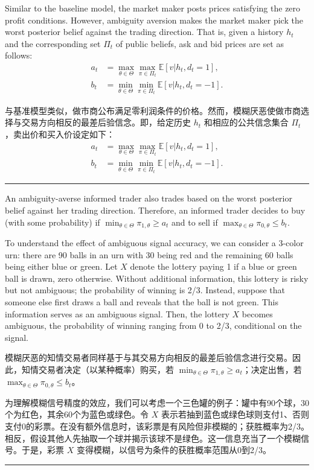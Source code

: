 \documentclass[12pt,a4paper]{article}
\newenvironment{original}{%
  \par\vspace{4pt}\noindent%
  \color{black}%
  \ignorespaces
}{%
  \par\vspace{2pt}%
}
\newenvironment{translation}{%
  \par\vspace{2pt}\noindent%
  \color{transblue}%
  \ignorespaces
}{%
  \par\vspace{4pt}\hrule\vspace{6pt}%
}
\begin{document}
\begin{original}
Similar to the baseline model, the market maker posts prices satisfying the zero profit conditions. However, ambiguity aversion makes the market maker pick the worst posterior belief against the trading direction. That is, given a history $h_t$ and the corresponding set $\Pi_t$ of public beliefs, ask and bid prices are set as follows:
\begin{align*}
a_t &= \max_{\theta\in\Theta} \max_{\pi\in\Pi_t} \mathbb{E}[v|h_t, d_t=1], \\
b_t &= \min_{\theta\in\Theta} \min_{\pi\in\Pi_t} \mathbb{E}[v|h_t, d_t=-1].
\end{align*}
\end{original}
\begin{translation}
与基准模型类似，做市商公布满足零利润条件的价格。然而，模糊厌恶使做市商选择与交易方向相反的最差后验信念。即，给定历史 $h_t$ 和相应的公共信念集合 $\Pi_t$，卖出价和买入价设定如下：
\begin{align*}
a_t &= \max_{\theta\in\Theta} \max_{\pi\in\Pi_t} \mathbb{E}[v|h_t, d_t=1], \\
b_t &= \min_{\theta\in\Theta} \min_{\pi\in\Pi_t} \mathbb{E}[v|h_t, d_t=-1].
\end{align*}
\end{translation}

\begin{original}
An ambiguity-averse informed trader also trades based on the worst posterior belief against her trading direction. Therefore, an informed trader decides to buy (with some probability) if $\min_{\theta\in\Theta} \pi_{1,\theta} \geq a_t$ and to sell if $\max_{\theta\in\Theta} \pi_{0,\theta} \leq b_t$.

To understand the effect of ambiguous signal accuracy, we can consider a 3-color urn: there are 90 balls in an urn with 30 being red and the remaining 60 balls being either blue or green. Let $X$ denote the lottery paying 1 if a blue or green ball is drawn, zero otherwise. Without additional information, this lottery is risky but not ambiguous; the probability of winning is 2/3. Instead, suppose that someone else first draws a ball and reveals that the ball is not green. This information serves as an ambiguous signal. Then, the lottery $X$ becomes ambiguous, the probability of winning ranging from 0 to 2/3, conditional on the signal.
\end{original}
\begin{translation}
模糊厌恶的知情交易者同样基于与其交易方向相反的最差后验信念进行交易。因此，知情交易者决定（以某种概率）购买，若 $\min_{\theta\in\Theta} \pi_{1,\theta} \geq a_t$；决定出售，若 $\max_{\theta\in\Theta} \pi_{0,\theta} \leq b_t$。

为理解模糊信号精度的效应，我们可以考虑一个三色罐的例子：罐中有90个球，30个为红色，其余60个为蓝色或绿色。令 $X$ 表示若抽到蓝色或绿色球则支付1、否则支付0的彩票。在没有额外信息时，该彩票是有风险但非模糊的；获胜概率为2/3。相反，假设其他人先抽取一个球并揭示该球不是绿色。这一信息充当了一个模糊信号。于是，彩票 $X$ 变得模糊，以信号为条件的获胜概率范围从0到2/3。
\end{translation}
\end{document}
